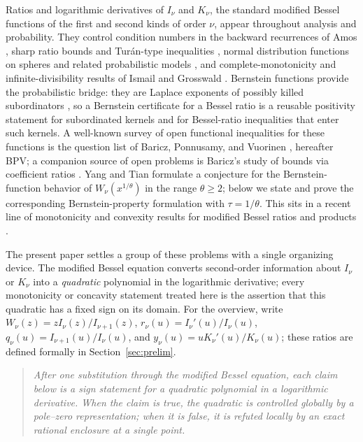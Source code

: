 \documentclass[preprint,12pt]{elsarticle}
\theoremstyle{plain}
\theoremstyle{definition}
\theoremstyle{remark}
\begin{document}
Ratios and logarithmic derivatives of \(I_\nu\) and \(K_\nu\), the standard
modified Bessel functions of the first and second kinds of order \(\nu\),
appear throughout analysis and probability. They
control condition numbers in the backward recurrences of Amos \cite{amos},
sharp ratio bounds and Tur\'an-type inequalities
\cite{turan,nasell,simpson-spector,ifantis-siafarikas,laforgia-natalini,
baricz-turan-modified,joshi-bissu,segura,hornik-gruen-2013,
ruiz-antolin-segura,hornik-gruen-2024}, normal distribution functions on
spheres and related probabilistic models \cite{hartman-watson,robert}, and
complete-monotonicity and infinite-divisibility results of Ismail and Grosswald
\cite{ismail,ismail-1990,ismail-kelker,grosswald}. Bernstein functions provide the
probabilistic bridge: they are Laplace exponents of possibly killed subordinators
\cite{schilling-song-vondracek}, so a Bernstein certificate for a Bessel ratio
is a reusable positivity statement for subordinated kernels and for
Bessel-ratio inequalities that enter such kernels. A well-known
survey of open functional inequalities for these functions is the question
list of Baricz, Ponnusamy, and Vuorinen \cite{bpv}, hereafter BPV; a companion
source of open problems is Baricz's study of bounds via coefficient ratios
\cite{baricz-bounds}. Yang and Tian \cite[Conjecture~3]{yang-tian} formulate a
conjecture for the Bernstein-function behavior of \(W_\nu(x^{1/\theta})\)
in the range \(\theta\ge2\); below we state and prove the corresponding
Bernstein-property formulation with \(\tau=1/\theta\).
This sits in a recent line of monotonicity and convexity results for modified
Bessel ratios and products
\cite{yang-zheng-k,yang-zheng-i,segura-2021,yang-chu-k,mao-tian-k,yang-tian}.

The present paper settles a group of these problems with a single organizing
device. The modified Bessel equation converts second-order information about
\(I_\nu\) or \(K_\nu\) into a \emph{quadratic} polynomial in the logarithmic
derivative; every monotonicity or concavity statement treated here is the
assertion that this quadratic has a fixed sign on its domain.
For the overview, write \(W_\nu(z)=zI_\nu(z)/I_{\nu+1}(z)\),
\(r_\nu(u)=I_\nu'(u)/I_\nu(u)\), \(q_\nu(u)=I_{\nu+1}(u)/I_\nu(u)\), and
\(y_\nu(u)=uK_\nu'(u)/K_\nu(u)\); these ratios are defined formally in
Section~\ref{sec:prelim}.

\begin{quote}
\emph{After one substitution through the modified Bessel equation, each claim
below is a sign statement for a quadratic polynomial in a logarithmic
derivative. When the claim is true, the quadratic is controlled globally by a
pole--zero representation; when it is false, it is refuted locally by an exact
rational enclosure at a single point.}
\end{quote}
\end{document}
